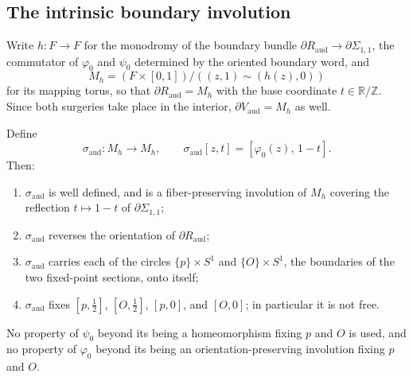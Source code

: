 
\subsection{The intrinsic boundary involution}\label{sec:sigma-aud}

Write $h\colon F\to F$ for the monodromy of the boundary bundle
$\partial R_{\mathrm{aud}}\to\partial\Sigma_{1,1}$, the commutator of
$\varphi_0$ and $\psi_0$ determined by the oriented boundary word, and
\[
 M_h=(F\times[0,1])/((z,1)\sim(h(z),0))
\]
for its mapping torus, so that $\partial R_{\mathrm{aud}}=M_h$ with the
base coordinate $t\in\mathbb R/\mathbb Z$.  Since both surgeries take
place in the interior, $\partial V_{\mathrm{aud}}=M_h$ as well.

\begin{lemma}\label{lem:sigma-aud}
Define
\[
 \sigma_{\mathrm{aud}}\colon M_h\to M_h,\qquad
 \sigma_{\mathrm{aud}}[z,t]=[\varphi_0(z),\,1-t].
\]
Then:
\begin{enumerate}
\item[(i)] $\sigma_{\mathrm{aud}}$ is well defined, and is a
 fiber-preserving involution of $M_h$ covering the reflection
 $t\mapsto 1-t$ of $\partial\Sigma_{1,1}$;
\item[(ii)] $\sigma_{\mathrm{aud}}$ reverses the orientation of
 $\partial R_{\mathrm{aud}}$;
\item[(iii)] $\sigma_{\mathrm{aud}}$ carries each of the circles
 $\{p\}\times S^1$ and $\{O\}\times S^1$, the boundaries of the two
 fixed-point sections, onto itself;
\item[(iv)] $\sigma_{\mathrm{aud}}$ fixes $[p,\tfrac12]$, $[O,\tfrac12]$,
 $[p,0]$, and $[O,0]$; in particular it is not free.
\end{enumerate}
No property of $\psi_0$ beyond its being a homeomorphism fixing $p$ and $O$
is used, and no property of $\varphi_0$ beyond its being an
orientation-preserving involution fixing $p$ and $O$.
\end{lemma}

